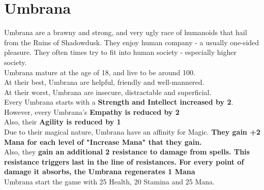 \section{Umbrana}
Umbrana are a brawny and strong, and very ugly race of humanoids that hail from the Ruins of Shadowdusk. They enjoy human company - a usually one-sided pleasure. They often times try to fit into human society - especially higher society.\\
Umbrana mature at the age of 18, and live to be around 100.\\
At their best, Umbrana are helpful, friendly and well-mannered.\\
At their worst, Umbrana are insecure, distractable and superficial.\\
Every Umbrana starts with a \textbf{Strength and Intellect increased by 2}.\\
However, every Umbrana's \textbf{Empathy is reduced by 2}\\
Also, their \textbf{Agility is reduced by 1}\\
Due to their magical nature, Umbrana have an affinity for Magic. \textbf{They gain +2 Mana for each level of "Increase Mana" that they gain.}\\
Also, they \textbf{gain an additional 2 resistance to damage from spells. This resistance triggers last in the line of resistances. For every point of damage it absorbs, the Umbrana regenerates 1 Mana}\\
Umbrana start the game with 25 Health, 20 Stamina and 25 Mana.\\